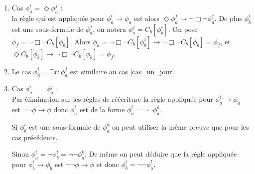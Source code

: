 \documentclass[12pt]{article}
\newcommand{\lra}{\ensuremath{\longrightarrow}}
\begin{document}
\begin{enumerate}
\item \label{cas_un_jour}
  Cas \(\phi_a^i = \Diamond \phi_a^j\) : \\
  la règle qui est appliquée pour \(\phi_a^i \lra \phi_a\) est alors \(\Diamond \phi_a^j \lra \neg \Box \neg \phi_a^j\).
  De plus \(\phi_b^i\) est une sous-formule de \(\phi_a^j\), on notera \(\phi_a^j = C_b[\phi_b^i]\).
  On pose \(\phi_f = \neg \Box \neg C_b[\phi_b]\).
  Alors \(\phi_a = \neg \Box \neg C_b[\phi_b^i] \lra \neg \Box \neg C_b[\phi_b] = \phi_f\), et \(\Diamond C_b[\phi_b] \lra \neg \Box \neg C_b[\phi_b] = \phi_f\).

\item \label{cas_exists}
  Le {cas \(\phi_a^i = \exists x : \phi_a^j\)} est similaire au cas \ref{cas_un_jour}.
\item \label{cas_neg}
  Cas \(\phi_a^i = \neg \phi_a^j\) : \\
  Par élimination sur les règles de réécriture la règle appliquée pour \(\phi_a^i \lra \phi_a\) est \(\neg \neg \phi \lra \phi\) donc \(\phi_a^i\) est de la forme \(\phi_a^i = \neg \neg \phi_a^k\).

  Si \(\phi_b^i\) est une sous-formule de \(\phi_a^k\) on peut utiliser la même preuve que pour les cas précédents.
  
  Sinon \(\phi_a^i = \neg \phi_b^i = \neg \neg \phi_a^k\).
  De même on peut déduire que la règle appliquée pour \(\phi_b^i \lra \phi_b\) est \(\neg \neg \phi \lra \phi\) et donc \(\phi_b^i = \neg \neg \phi_a^l\).


\end{enumerate}
\end{document}
